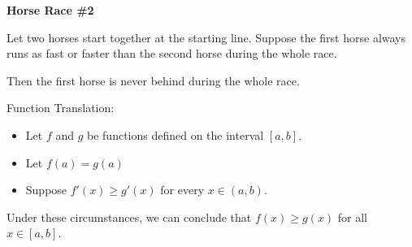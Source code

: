 \documentclass{ximera}
\begin{document}
\begin{idea} \textbf{\textcolor{blue!55!black}{Horse Race \#2}}   


Let two horses start together at the starting line. Suppose the first horse always runs as fast or faster than the second horse during the whole race.

Then the first horse is never behind during the whole race.



\begin{model} Function Translation:

\begin{itemize}
\item Let $f$ and $g$ be functions defined on the interval $[a, b]$. 
\item Let $f(a) = g(a)$
\item Suppose $f'(x) \geq g'(x)$ for every $x \in (a,b)$. 
\end{itemize}

Under these circumstances, we can conclude that $f(x) \geq g(x)$ for all $x \in [a,b]$.

\end{model}

\end{idea}
\end{document}
